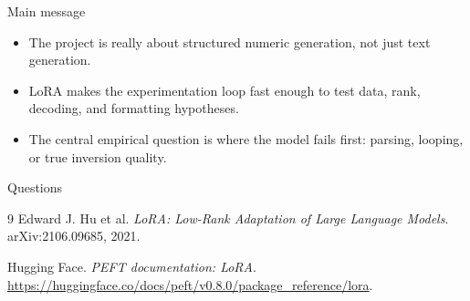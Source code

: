 \documentclass[aspectratio=169,professionalfonts]{beamer}
\begin{document}
\begin{frame}{Main message}
\begin{itemize}[itemsep=0.75em]
    \item The project is really about \alert{structured numeric generation}, not just text generation.
    \item LoRA makes the experimentation loop fast enough to test data, rank, decoding, and formatting hypotheses.
    \item The central empirical question is where the model fails first: parsing, looping, or true inversion quality.
\end{itemize}

\vspace{1em}
\centering
\Large Questions
\end{frame}

\begin{thebibliography}{9}
Edward J. Hu et al.
\newblock \emph{LoRA: Low-Rank Adaptation of Large Language Models}.
\newblock arXiv:2106.09685, 2021.

Hugging Face.
\newblock \emph{PEFT documentation: LoRA}.
\newblock \url{https://huggingface.co/docs/peft/v0.8.0/package_reference/lora}.
\end{thebibliography}
\end{document}
